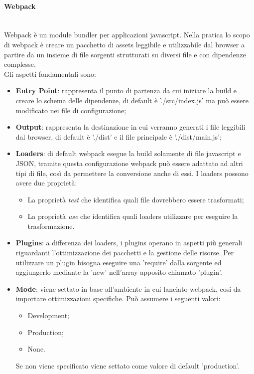 \paragraph{Webpack} \label{webpack}\-\\
Webpack è un module bundler per applicazioni javascript. Nella pratica lo scopo di webpack è creare un pacchetto di assets leggibile e utilizzabile dal browser a partire da un insieme di file sorgenti strutturati su diversi file e con dipendenze complesse. \\
Gli aspetti fondamentali sono:
\begin{itemize}
\item \textbf{Entry Point}: rappresenta il punto di partenza da cui iniziare la build e creare lo schema delle dipendenze, di default è './src/index.js' ma può essere modificato nei file di configurazione;
\item \textbf{Output}: rappresenta la destinazione in cui verranno generati i file leggibili dal browser, di default è './dist' e il file principale è './dist/main.js';
\item \textbf{Loaders}: di default webpack esegue la build solamente di file javascript e JSON, tramite questa configurazione webpack può essere adattato ad altri tipi di file, così da permettere la conversione anche di essi. I loaders possono avere due proprietà: 
	\begin{itemize}
	\item La proprietà \textit{test} che identifica quali file dovrebbero essere trasformati;
	\item La proprietà \textit{use} che identifica quali loaders utilizzare per eseguire la trasformazione.
	\end{itemize}
\item \textbf{Plugins}: a differenza dei loaders, i plugins operano in aspetti più generali riguardanti l'ottimizzazione dei pacchetti e la gestione delle risorse. Per utilizzare un plugin bisogna eseguire una 'require' dalla sorgente ed aggiungerlo mediante la 'new' nell'array apposito chiamato 'plugin'.
\item \textbf{Mode}: viene settato in base all'ambiente in cui lanciato webpack, cosi da importare ottimizzazioni specifiche. Può assumere i seguenti valori:
	\begin{itemize}
	\item Development;
	\item Production;
	\item None.
	\end{itemize}
Se non viene specificato viene settato come valore di default 'production'.
\end{itemize}

 





